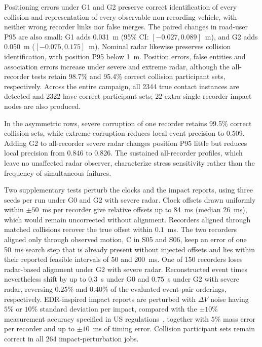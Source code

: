 Positioning errors under G1 and G2 preserve correct identification of
every collision and representation of every observable non-recording
vehicle, with neither wrong recorder links nor false merges. The paired
changes in road-user P95 are also small: G1 adds 0.031~m (95\% CI:
$[-0.027,0.089]$~m), and G2 adds 0.050~m ($[-0.075,0.175]$~m). Nominal
radar likewise preserves collision identification, with position P95
below 1~m. Position errors, false entities and association errors increase
under severe and extreme radar, although the all-recorder tests retain
98.7\% and 95.4\% correct collision participant sets, respectively.
Across the entire campaign, all 2344 true contact instances are detected
and 2322 have correct participant sets; 22 extra single-recorder impact
nodes are also produced.

In the asymmetric rows, severe corruption of one recorder retains
99.5\% correct collision sets, while extreme corruption reduces local
event precision to 0.509. Adding G2 to all-recorder severe
radar changes position P95 little but reduces local precision from 0.846
to 0.826. The sustained all-recorder profiles, which leave no unaffected
radar observer, characterize stress sensitivity rather than the
frequency of simultaneous failures.

Two supplementary tests perturb the clocks and the impact reports,
using three seeds per run under G0 and G2 with severe radar.
Clock offsets drawn uniformly within $\pm50$~ms per recorder
give relative offsets up to 84~ms (median 26~ms), which would
remain uncorrected without alignment. Recorders aligned through
matched collisions recover the true offset within $0.1$~ms.
The two recorders aligned only through observed motion, C in
S05 and S06, keep an error of one 50~ms search step that is
already present without injected offsets and lies within their
reported feasible intervals of 50 and 200~ms. One of $150$
recorders loses radar-based alignment under G2 with severe radar. Reconstructed event times nevertheless
shift by up to $0.3$~s under G0 and $0.75$~s under G2 with
severe radar, reversing $0.25\%$ and $0.40\%$ of the evaluated
event-pair orderings, respectively. EDR-inspired impact
reports are perturbed with $\Delta V$ noise having $5\%$ or
$10\%$ standard deviation per impact, compared with the
$\pm10\%$ measurement accuracy specified in US
regulations~\cite{cfr563}, together with $5\%$ mass error
per recorder and up to $\pm10$~ms of timing error.
Collision participant sets remain correct in all
$264$ impact-perturbation jobs.

